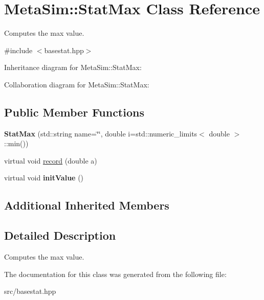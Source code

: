 \hypertarget{classMetaSim_1_1StatMax}{}\section{Meta\+Sim\+:\+:Stat\+Max Class Reference}
\label{classMetaSim_1_1StatMax}


Computes the max value.  




{\ttfamily \#include $<$basestat.\+hpp$>$}



Inheritance diagram for Meta\+Sim\+:\+:Stat\+Max\+:


Collaboration diagram for Meta\+Sim\+:\+:Stat\+Max\+:
\subsection*{Public Member Functions}
\begin{DoxyCompactItemize}
\item 
{\bfseries Stat\+Max} (std\+::string name=\char`\"{}\char`\"{}, double i=std\+::numeric\+\_\+limits$<$ double $>$\+::min())
\item 
virtual void \hyperlink{group__metasim__stat_ga6dfddcc795d8681dd33bef7eb4debd8b}{record} (double a)
\item 
virtual void {\bfseries init\+Value} ()
\end{DoxyCompactItemize}
\subsection*{Additional Inherited Members}


\subsection{Detailed Description}
Computes the max value. 

The documentation for this class was generated from the following file\+:\begin{DoxyCompactItemize}
\item 
src/basestat.\+hpp\end{DoxyCompactItemize}
